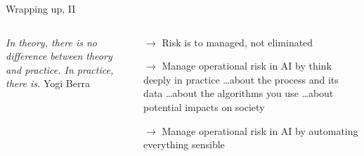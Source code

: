 \begin{frame}{Wrapping up, II}
\begin{columns}[T]
\begin{column}{.40\textwidth}
            \emph{In theory, there is no difference between theory and practice. \newline
            In practice, there is.}\newline
            Yogi Berra
        \end{column}
        \begin{column}{0.56\textwidth}%
                \begin{block}{$\rightarrow$ Risk is to managed, not eliminated}
            \end{block}
            \begin{block}{$\rightarrow$ Manage operational risk in AI by think deeply in practice}
                \ldots about the process and its data
                \newline
                \ldots about the algorithms you use
                \newline
                \ldots about potential impacts on society
            \end{block}
            \begin{block}{$\rightarrow$ Manage operational risk in AI by automating everything sensible}
            \end{block}
        \end{column}
    \end{columns}
\end{frame}

